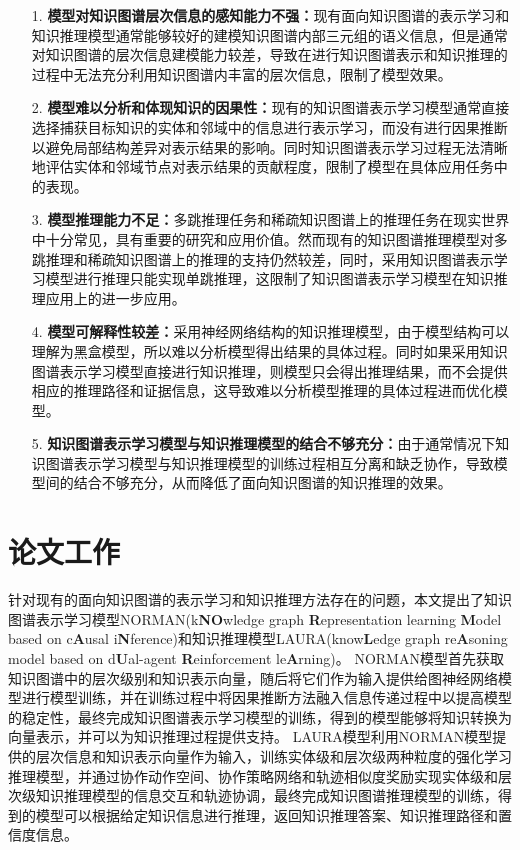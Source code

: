 \documentclass[algorithmlist, AutoFakeBold, AutoFakeSlant, figurelist, tablelist, nomlist, masters]{seuthesix}
\begin{document}
\begin{itemize}
  \item [1.]\textbf{模型对知识图谱层次信息的感知能力不强：}现有面向知识图谱的表示学习和知识推理模型通常能够较好的建模知识图谱内部三元组的语义信息，但是通常对知识图谱的层次信息建模能力较差，导致在进行知识图谱表示和知识推理的过程中无法充分利用知识图谱内丰富的层次信息，限制了模型效果。
  \item [2.]\textbf{模型难以分析和体现知识的因果性：}现有的知识图谱表示学习模型通常直接选择捕获目标知识的实体和邻域中的信息进行表示学习，而没有进行因果推断以避免局部结构差异对表示结果的影响。同时知识图谱表示学习过程无法清晰地评估实体和邻域节点对表示结果的贡献程度，限制了模型在具体应用任务中的表现。
  \item [3.]\textbf{模型推理能力不足：}多跳推理任务和稀疏知识图谱上的推理任务在现实世界中十分常见，具有重要的研究和应用价值。然而现有的知识图谱推理模型对多跳推理和稀疏知识图谱上的推理的支持仍然较差，同时，采用知识图谱表示学习模型进行推理只能实现单跳推理，这限制了知识图谱表示学习模型在知识推理应用上的进一步应用。
  \item [4.]\textbf{模型可解释性较差：}采用神经网络结构的知识推理模型，由于模型结构可以理解为黑盒模型，所以难以分析模型得出结果的具体过程。同时如果采用知识图谱表示学习模型直接进行知识推理，则模型只会得出推理结果，而不会提供相应的推理路径和证据信息，这导致难以分析模型推理的具体过程进而优化模型。
  \item [5.]\textbf{知识图谱表示学习模型与知识推理模型的结合不够充分：}由于通常情况下知识图谱表示学习模型与知识推理模型的训练过程相互分离和缺乏协作，导致模型间的结合不够充分，从而降低了面向知识图谱的知识推理的效果。
\end{itemize}

\section{论文工作}
针对现有的面向知识图谱的表示学习和知识推理方法存在的问题，本文提出了知识图谱表示学习模型NORMAN(k\textbf{NO}wledge graph \textbf{R}epresentation learning \textbf{M}odel based on c\textbf{A}usal i\textbf{N}ference)和知识推理模型LAURA(know\textbf{L}edge graph re\textbf{A}soning model based on d\textbf{U}al-agent \textbf{R}einforcement le\textbf{A}rning)。
NORMAN模型首先获取知识图谱中的层次级别和知识表示向量，随后将它们作为输入提供给图神经网络模型进行模型训练，并在训练过程中将因果推断方法融入信息传递过程中以提高模型的稳定性，最终完成知识图谱表示学习模型的训练，得到的模型能够将知识转换为向量表示，并可以为知识推理过程提供支持。
LAURA模型利用NORMAN模型提供的层次信息和知识表示向量作为输入，训练实体级和层次级两种粒度的强化学习推理模型，并通过协作动作空间、协作策略网络和轨迹相似度奖励实现实体级和层次级知识推理模型的信息交互和轨迹协调，最终完成知识图谱推理模型的训练，得到的模型可以根据给定知识信息进行推理，返回知识推理答案、知识推理路径和置信度信息。
\end{document}

